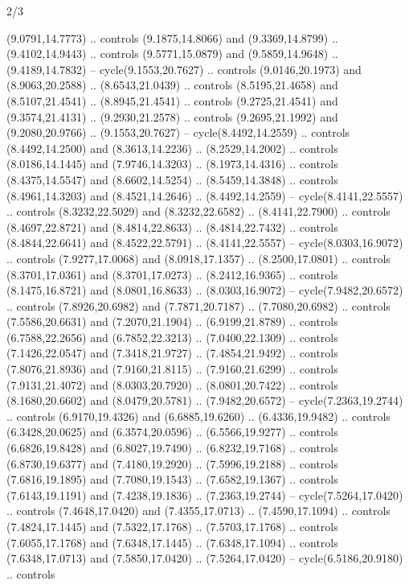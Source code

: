 \begin{flagdescription}{2/3}
\begin{scope}[yshift=\flagwidth,scale=\flagwidth/1241.93737]
\begin{scope}[y=-1mm, x=1mm,draw=gold,fill=blue,line join=miter,miter limit=4,line width=1.8\lw]
{  (9.0791,14.7773) .. controls (9.1875,14.8066) and (9.3369,14.8799) ..
  (9.4102,14.9443) .. controls (9.5771,15.0879) and (9.5859,14.9648) ..
  (9.4189,14.7832) -- cycle(9.1553,20.7627) .. controls (9.0146,20.1973) and
  (8.9063,20.2588) .. (8.6543,21.0439) .. controls (8.5195,21.4658) and
  (8.5107,21.4541) .. (8.8945,21.4541) .. controls (9.2725,21.4541) and
  (9.3574,21.4131) .. (9.2930,21.2578) .. controls (9.2695,21.1992) and
  (9.2080,20.9766) .. (9.1553,20.7627) -- cycle(8.4492,14.2559) .. controls
  (8.4492,14.2500) and (8.3613,14.2236) .. (8.2529,14.2002) .. controls
  (8.0186,14.1445) and (7.9746,14.3203) .. (8.1973,14.4316) .. controls
  (8.4375,14.5547) and (8.6602,14.5254) .. (8.5459,14.3848) .. controls
  (8.4961,14.3203) and (8.4521,14.2646) .. (8.4492,14.2559) --
  cycle(8.4141,22.5557) .. controls (8.3232,22.5029) and (8.3232,22.6582) ..
  (8.4141,22.7900) .. controls (8.4697,22.8721) and (8.4814,22.8633) ..
  (8.4814,22.7432) .. controls (8.4844,22.6641) and (8.4522,22.5791) ..
  (8.4141,22.5557) -- cycle(8.0303,16.9072) .. controls (7.9277,17.0068) and
  (8.0918,17.1357) .. (8.2500,17.0801) .. controls (8.3701,17.0361) and
  (8.3701,17.0273) .. (8.2412,16.9365) .. controls (8.1475,16.8721) and
  (8.0801,16.8633) .. (8.0303,16.9072) -- cycle(7.9482,20.6572) .. controls
  (7.8926,20.6982) and (7.7871,20.7187) .. (7.7080,20.6982) .. controls
  (7.5586,20.6631) and (7.2070,21.1904) .. (6.9199,21.8789) .. controls
  (6.7588,22.2656) and (6.7852,22.3213) .. (7.0400,22.1309) .. controls
  (7.1426,22.0547) and (7.3418,21.9727) .. (7.4854,21.9492) .. controls
  (7.8076,21.8936) and (7.9160,21.8115) .. (7.9160,21.6299) .. controls
  (7.9131,21.4072) and (8.0303,20.7920) .. (8.0801,20.7422) .. controls
  (8.1680,20.6602) and (8.0479,20.5781) .. (7.9482,20.6572) --
  cycle(7.2363,19.2744) .. controls (6.9170,19.4326) and (6.6885,19.6260) ..
  (6.4336,19.9482) .. controls (6.3428,20.0625) and (6.3574,20.0596) ..
  (6.5566,19.9277) .. controls (6.6826,19.8428) and (6.8027,19.7490) ..
  (6.8232,19.7168) .. controls (6.8730,19.6377) and (7.4180,19.2920) ..
  (7.5996,19.2188) .. controls (7.6816,19.1895) and (7.7080,19.1543) ..
  (7.6582,19.1367) .. controls (7.6143,19.1191) and (7.4238,19.1836) ..
  (7.2363,19.2744) -- cycle(7.5264,17.0420) .. controls (7.4648,17.0420) and
  (7.4355,17.0713) .. (7.4590,17.1094) .. controls (7.4824,17.1445) and
  (7.5322,17.1768) .. (7.5703,17.1768) .. controls (7.6055,17.1768) and
  (7.6348,17.1445) .. (7.6348,17.1094) .. controls (7.6348,17.0713) and
  (7.5850,17.0420) .. (7.5264,17.0420) -- cycle(6.5186,20.9180) .. controls
}
\end{scope}
\end{scope}
\end{flagdescription}
